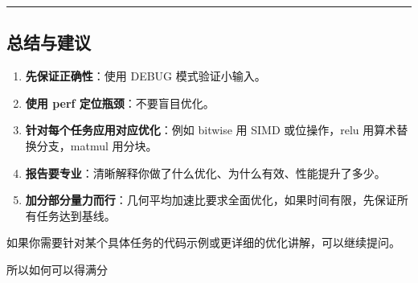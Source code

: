 \documentclass[11pt, a4paper]{article}
\begin{document}
\begin{aibox}
\begin{center}\rule{\textwidth}{0.4pt}\end{center}

\subsection*{总结与建议}

\begin{enumerate}
    \item \textbf{先保证正确性}：使用 DEBUG 模式验证小输入。
    \item \textbf{使用 perf 定位瓶颈}：不要盲目优化。
    \item \textbf{针对每个任务应用对应优化}：例如 bitwise 用 SIMD 或位操作，relu 用算术替换分支，matmul 用分块。
    \item \textbf{报告要专业}：清晰解释你做了什么优化、为什么有效、性能提升了多少。
    \item \textbf{加分部分量力而行}：几何平均加速比要求全面优化，如果时间有限，先保证所有任务达到基线。
\end{enumerate}

如果你需要针对某个具体任务的代码示例或更详细的优化讲解，可以继续提问。
\end{aibox}

\vspace{1.5em}

\begin{userbox}
所以如何可以得满分
\end{userbox}
\end{document}
